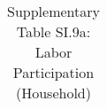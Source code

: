 \begin{longtable}{llcccccccccc}
\caption{Supplementary Table SI.9a: Labor Participation (Household)} \label{tab:pap__d3_daysa} \\                                                                                                                                                                                                                                                                                                                                                                                                                                                                                                                                                                                                                                                                                                                                                                                         
\hline \hline                                                                                                                                                                                                                                                                                                                                                                                                                                                                                                                                                                                                                                                                                                                                                                                                                                                                             

\end{longtable}
